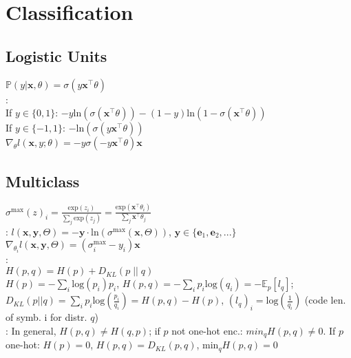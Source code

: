 \section{Classification}
\subsection*{Logistic Units}
$\mathbb{P}(y | \mathbf{x}, \theta) = \sigma(y\mathbf{x}^{\top} \theta)$\\
:  \\
If $y \in \{ 0, 1\}$: $-y \text{ln}(\sigma(\mathbf{x}^{\top} \theta)) - (1 - y) \text{ln}(1 - \sigma(\mathbf{x}^{\top} \theta))$ \\
If $y \in \{ -1, 1\}$: $- \text{ln}(\sigma(y\mathbf{x}^{\top}\theta))$ \\
$\nabla_{\theta}l(\mathbf{x}, y; \theta) = -y \sigma(-y\mathbf{x}^{\top} \theta)\mathbf{x}$
\subsection*{Multiclass}
$\sigma^{\text{max}} (z)_i {=} \frac{\text{exp}(z_i)}{\sum_j \text{exp}(z_j)} = \frac{\text{exp}(\mathbf{x}^{\top} \theta_i)}{\sum_j \mathbf{x}^{\top} \theta_j}$ \\
:
$l(\mathbf{x}, \mathbf{y}, \Theta) = -\mathbf{y} \cdot \text{ln}(\sigma^{\text{max}}(\mathbf{x}, \Theta))$, $\mathbf{y}\in \{ \mathbf{e}_1, \mathbf{e}_2, ...\}$ \\
$\nabla _{\theta _i} l(\mathbf{x}, \mathbf{y}, \Theta) = (\sigma^{\text{max}}_i - y_i) \mathbf{x}$ \\
: \\
$H(p, q) = H(p) + D_{KL}(p \; || \; q)$ \\
$H(p) = - \sum_i \text{log}(p_i)p_i$, $H(p, q) = - \sum_i p_i \text{log}(q_i) = - \mathbb{E}_p [l_q]$; $D_{KL}(p || q) = \sum_i p_i \text{log}(\frac{p_i}{q_i}) = H(p, q) - H(p)$, $(l_q)_i = \text{log}(\frac{1}{q_i})$ (code len. of symb. i for distr. $q$)\\
: In general, $H(p, q) \neq H(q, p)$; if $p$ not one-hot enc.: $min_q H(p, q) \neq 0$. If $p$ one-hot: $H(p) = 0$, $H(p, q) = D_{KL}(p, q)$, $\text{min}_q H(p, q) = 0$


